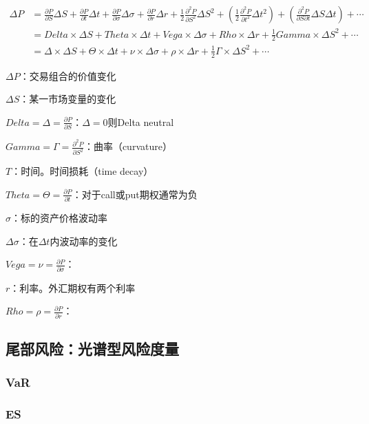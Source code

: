 \documentclass[12pt]{book}
\begin{document}
\begin{align*}
    \Delta P& = \frac{\partial P}{\partial S}\Delta S+\frac{\partial P}{\partial t}\Delta t+\frac{\partial P}{\partial\sigma}\Delta\sigma+\frac{\partial P}{\partial r}\Delta r
    + \frac{1}{2} \frac{\partial^2P}{\partial S^2} \Delta S^2
    + \left( \frac{1}{2}\frac{\partial^{2}P}{\partial t^2}\Delta t^2 \right)
    + \left( \frac{\partial^{2}P}{\partial S\partial t}\Delta S\Delta t \right) +\cdots \\
    & = Delta\times\Delta S + Theta\times\Delta t+Vega\times\Delta\sigma+Rho\times\Delta r+\frac{1}{2}Gamma\times\Delta S^2+\cdots \\
    & = \Delta\times\Delta S+\Theta\times\Delta t+\nu \times\Delta\sigma+\rho\times\Delta r+\frac{1}{2}\Gamma\times\Delta S^2+\cdots 
\end{align*}
\par $\Delta P$：交易组合的价值变化
\par $\Delta S$：某一市场变量的变化
\par $Delta=\Delta =\frac{\partial P}{\partial S}$：$\Delta=0$则Delta neutral
\par $Gamma=\Gamma=\frac{\partial^2P}{\partial S^2}$：曲率（curvature）
\par $T$：时间。时间损耗（time decay）
\par $Theta=\Theta=\frac{\partial P}{\partial t}$：对于call或put期权通常为负
\par $\sigma$：标的资产价格波动率
\par $\Delta \sigma$：在$\Delta t$内波动率的变化
\par $Vega=\nu=\frac{\partial P}{\partial\sigma}$：
\par $r$：利率。外汇期权有两个利率
\par $Rho=\rho=\frac{\partial P}{\partial r}$：







\subsection{尾部风险：光谱型风险度量}

\subsubsection{VaR}


\subsubsection{ES}
\end{document}
